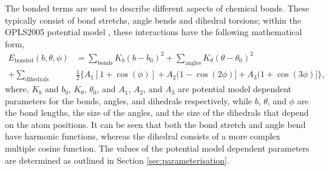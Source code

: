 The bonded terms are used to describe different aspects of chemical bonds.
These typically consist of bond stretchs, angle bends and dihedral torsions; within the OPLS2005 potential model \cite{Banks2005}, these interactions have the following mathematical form,
%
\begin{equation}
\begin{aligned}
  E_{\text{bonded}}(b, \theta, \phi) & = \sum_{\text{bonds}}K_b(b-b_0)^2 + \sum_{\text{angles}}K_{\theta}(\theta-\theta_0)^2 \\
  + \sum_{\text{dihedrals}} & \frac{1}{2}\big\{A_1[1 + \cos(\phi)] + A_2(1 - \cos(2\phi)] + A_3(1 + \cos(3\phi)]\big\},
\end{aligned}
\end{equation}
%
where, $K_b$ and $b_0$, $K_{\theta}$, $\theta_0$, and $A_1$, $A_2$, and $A_3$ are potential model dependent parameters for the bonds, angles, and dihedrals respectively, while $b$, $\theta$, and $\phi$ are the bond lengths, the size of the angles, and the size of the dihedrals that depend on the atom positions.
It can be seen that both the bond stretch and angle bend have harmonic functions, whereas the dihedral consists of a more complex multiple cosine function.
The values of the potential model dependent parameters are determined as outlined in Section \ref{sec:parameterisation}.

